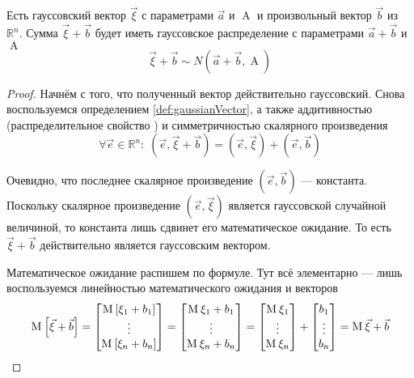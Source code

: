 \begin{lemma}\label{lemma:gaussMoved}
  Есть гауссовский вектор $\vec{\xi}$ с параметрами $\vec{a}$ и $\operatorname{A}$
  и произвольный вектор $\vec{b}$ из $\mathbb{R}^n$.
  Сумма $\vec{\xi} + \vec{b}$ будет иметь гауссовское распределение с
  параметрами $\vec{a} + \vec{b}$ и $\operatorname{A}$
  $$\vec{\xi} + \vec{b} \sim N\left( \vec{a} + \vec{b}, \operatorname{A} \right)$$
\end{lemma}
\begin{proof}
  Начнём с того, что полученный вектор действительно гауссовский.
  Снова воспользуемся определением \ref{def:gaussianVector}, а также
  аддитивностью (распределительное свойство \cite[с.~82]{VoevodinLA})
  и симметричностью скалярного произведения
  $$\forall \vec{e} \in \mathbb{R}^n:\;
      \left( \vec{e}, \vec{\xi} + \vec{b} \right)
      = \left( \vec{e}, \vec{\xi} \right)
          + \left( \vec{e}, \vec{b} \right)$$

  Очевидно, что последнее скалярное произведение
  $\left( \vec{e}, \vec{b} \right)$ --- константа. Поскольку скалярное
  произведение $\left( \vec{e}, \vec{\xi} \right)$ является гауссовской
  случайной величиной, то константа лишь сдвинет его математическое
  ожидание. То есть $\vec{\xi} + \vec{b}$ действительно является
  гауссовским вектором.

  Математическое ожидание распишем по формуле. Тут всё элементарно --- лишь
  воспользуемся линейностью математического ожидания и векторов
  $$\operatorname{M}_{} \left[ \vec{\xi} + \vec{b} \right]
      =   \begin{bmatrix}
          \operatorname{M}_{} \left[ \xi_1 + b_1 \right] \\\vdots \\\operatorname{M}_{} \left[ \xi_n + b_n \right]
      \end{bmatrix}
      =   \begin{bmatrix}
          \operatorname{M}_{} \xi_1 + b_1 \\\vdots \\\operatorname{M}_{} \xi_n + b_n
      \end{bmatrix}
      =   \begin{bmatrix}
          \operatorname{M}_{} \xi_1 \\\vdots \\\operatorname{M}_{} \xi_n
      \end{bmatrix}
      +
      \begin{bmatrix}
          b_1 \\\vdots \\ b_n
      \end{bmatrix}
      = \operatorname{M}_{} \vec{\xi} + \vec{b}$$


\end{proof}
